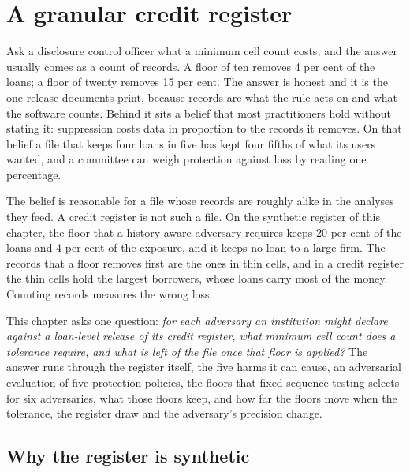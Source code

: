 \chapter{A granular credit register}\label{ch:credit}

Ask a disclosure control officer what a minimum cell count costs, and the answer
usually comes as a count of records. A floor of ten removes 4 per cent of the loans;
a floor of twenty removes 15 per cent.
The answer is honest and it is the one release documents print, because records are
what the rule acts on and what the software counts. Behind it sits a belief that
most practitioners hold without stating it: suppression costs data in proportion to
the records it removes. On that belief a file that keeps four loans in five has kept
four fifths of what its users wanted, and a committee can weigh protection against
loss by reading one percentage.

The belief is reasonable for a file whose records are roughly alike in the analyses
they feed. A credit register is not such a file. On the synthetic register of this
chapter, the floor that a history-aware adversary requires keeps 20 per cent of the
loans and 4 per cent of the exposure, and it keeps no loan to a large firm.
The records that a floor removes first are the ones in thin cells, and in a credit
register the thin cells hold the largest borrowers, whose loans carry most of the
money. Counting records measures the wrong loss.

This chapter asks one question: \emph{for each adversary an institution might
declare against a loan-level release of its credit register, what minimum cell count
does a tolerance require, and what is left of the file once that floor is applied?}
The answer runs through the register itself, the five harms it can cause, an
adversarial evaluation of five protection policies, the floors that fixed-sequence
testing selects for six adversaries, what those floors keep, and how far the floors
move when the tolerance, the register draw and the adversary's precision change.

\section{Why the register is synthetic}

